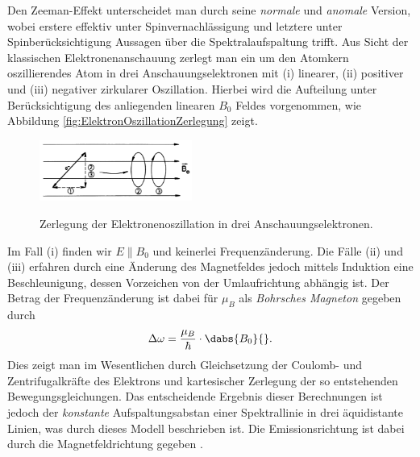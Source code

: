 Den Zeeman-Effekt unterscheidet man durch seine \emph{normale} und \emph{anomale} Version, wobei erstere effektiv unter Spinvernachlässigung und letztere unter Spinberücksichtigung Aussagen über die Spektralaufspaltung trifft. Aus Sicht der klassischen Elektronenanschauung zerlegt man ein um den Atomkern oszillierendes Atom in drei Anschauungselektronen mit (i) linearer, (ii) positiver und (iii) negativer zirkularer Oszillation. Hierbei wird die Aufteilung unter Berücksichtigung des anliegenden linearen $B_0$ Feldes vorgenommen, wie Abbildung \ref{fig:ElektronOszillationZerlegung} zeigt. 
\begin{figure}[H]
	\centering
	\includegraphics[width=5cm]{../../Bilddateien/Grundlagen/ElektronOszillationZerlegung.png}
	\label{fig:ElektronenOszillationZerlegung}
	\caption{Zerlegung der Elektronenoszillation in drei Anschauungselektronen.}
\end{figure}
Im Fall (i) finden wir $E\parallel B_0$ und keinerlei Frequenzänderung. Die Fälle (ii) und (iii) erfahren durch eine Änderung des Magnetfeldes jedoch mittels Induktion eine Beschleunigung, dessen Vorzeichen von der Umlaufrichtung abhängig ist. Der Betrag der Frequenzänderung ist dabei für $\mu_B$ als \emph{Bohrsches Magneton} gegeben durch 
\[
	\Delta\omega = \frac{\mu_B}{\hbar}\cdot\dabs{B_0}{}.
\]
Dies zeigt man im Wesentlichen durch Gleichsetzung der Coulomb- und Zentrifugalkräfte des Elektrons und kartesischer Zerlegung der so entstehenden Bewegungsgleichungen. Das entscheidende Ergebnis dieser Berechnungen ist jedoch der \emph{konstante} Aufspaltungsabstan einer Spektrallinie in drei äquidistante Linien, was durch dieses Modell beschrieben ist. Die Emissionsrichtung ist dabei durch die Magnetfeldrichtung gegeben \cite[p.216ff]{HakenWolf}.

